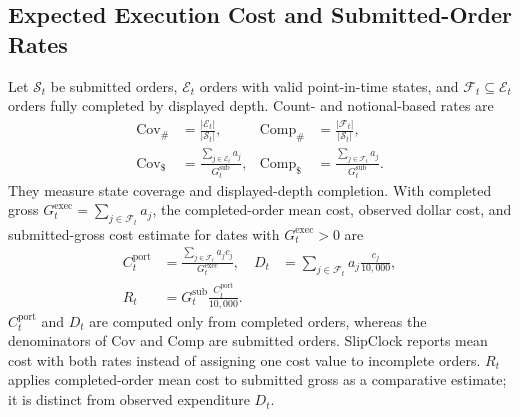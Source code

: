 \documentclass[sigconf]{acmart}
\begin{document}
\subsection{Expected Execution Cost and Submitted-Order Rates}
Let $\mathcal S_t$ be submitted orders, $\mathcal E_t$ orders with valid point-in-time states, and $\mathcal F_t\subseteq\mathcal E_t$ orders fully completed by displayed depth. Count- and notional-based rates are
\begin{align}
\mathrm{Cov}_{\#}&=\frac{|\mathcal E_t|}{|\mathcal S_t|}, &
\mathrm{Comp}_{\#}&=\frac{|\mathcal F_t|}{|\mathcal S_t|},\\
\mathrm{Cov}_{\$}&=\frac{\sum_{j\in\mathcal E_t}a_j}{G^{\mathrm{sub}}_t}, &
\mathrm{Comp}_{\$}&=\frac{\sum_{j\in\mathcal F_t}a_j}{G^{\mathrm{sub}}_t}.
\end{align}
They measure state coverage and displayed-depth completion. With completed gross $G^{\mathrm{exec}}_t=\sum_{j\in\mathcal F_t}a_j$, the completed-order mean cost, observed dollar cost, and submitted-gross cost estimate for dates with $G^{\mathrm{exec}}_t>0$ are
\begin{align}
C^{\mathrm{port}}_t
 &=\frac{\sum_{j\in\mathcal F_t}a_jc_j}{G^{\mathrm{exec}}_t}, &
D_t&=\sum_{j\in\mathcal F_t}a_j\frac{c_j}{10{,}000},\\
R_t&=G^{\mathrm{sub}}_t\frac{C_t^{\mathrm{port}}}{10{,}000}.&&
\end{align}
$C_t^{\mathrm{port}}$ and $D_t$ are computed only from completed orders, whereas the denominators of $\mathrm{Cov}$ and $\mathrm{Comp}$ are submitted orders. SlipClock reports mean cost with both rates instead of assigning one cost value to incomplete orders. $R_t$ applies completed-order mean cost to submitted gross as a comparative estimate; it is distinct from observed expenditure $D_t$.
\end{document}
